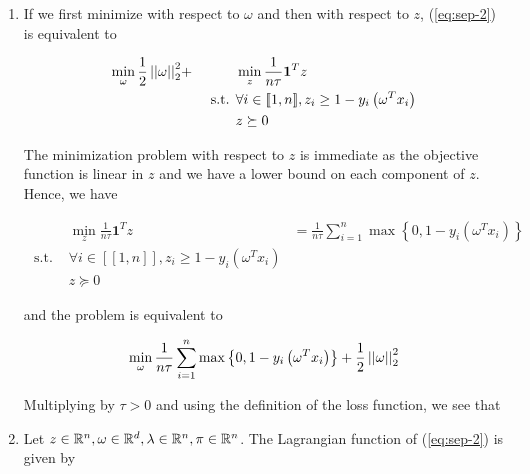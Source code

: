 \documentclass[a4paper, 11pt]{report}
\begin{document}
\begin{enumerate}
    \item If we first minimize with respect to $\omega$ and then with respect to $z$, (\ref{eq:sep-2}) is equivalent to
    
        \begin{equation*}
            \begin{aligned}
            \min_{\omega} \frac{1}{2} \left|\left| \omega \right|\right|_{2}^{2} & + & & \min_{z} \frac{1}{n \tau} \mathbf{1}^{T}z \\
            & & \text{ s.t. }
            & \forall i \in [\![ 1, n ]\!], z_{i} \geq 1 - y_{i} \left( \omega^{T} x_{i} \right) \\
            & & & z \succeq 0
            \end{aligned}
        \end{equation*}
        
    The minimization problem with respect to $z$ is immediate as the objective function is linear in $z$ and we have a lower bound on each component of $z$. Hence, we have
    
    \begin{equation*}
        \begin{aligned}
        & \min_{z} \frac{1}{n \tau} \mathbf{1}^{T} z & = \frac{1}{n \tau} \sum_{i=1}^{n} \max \left\{ 0, 1 - y_{i} \left( \omega^{T} x_{i} \right) \right\} \\
        \text{ s.t. } & \forall i \in [\![ 1, n ]\!], z_{i} \geq 1 - y_{i} \left( \omega^{T} x_{i} \right) \\
        & z \succeq 0
        \end{aligned}
    \end{equation*}
    
    and the problem is equivalent to
    
    \begin{equation}
    \min_{\omega} \frac{1}{n \tau} \sum_{i=1}^{n} \max \left\{ 0, 1 - y_{i} \left( \omega^{T} x_{i} \right) \right\} + \frac{1}{2} \left|\left| \omega \right|\right|_{2}^{2}
    \end{equation}
    
    Multiplying by $\tau > 0$ and using the definition of the loss function, we see that
    \begin{center}
    \end{center}
    
    \item Let $z \in \mathbb{R}^{n}, \omega \in \mathbb{R}^{d}, \lambda \in \mathbb{R}^{n}, \pi \in \mathbb{R}^{n}$. The Lagrangian function of (\ref{eq:sep-2}) is given by
    

\end{enumerate}
\end{document}
